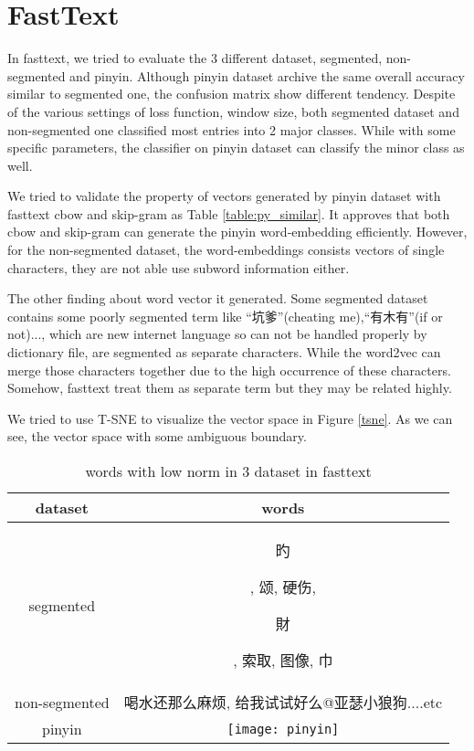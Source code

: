 \section{FastText}

In fasttext, we tried to evaluate the 3 different dataset, segmented, non-segmented and pinyin. 
Although pinyin dataset archive the same overall accuracy similar to segmented one, the confusion matrix show different tendency.
Despite of the various settings of loss function, window size, both segmented dataset and non-segmented one classified most entries into 2 major classes.
While with some specific parameters, the classifier on pinyin dataset can classify the minor class as well. 

We tried to validate the property of vectors generated by pinyin dataset with fasttext cbow and skip-gram as Table \ref{table:py_similar}. 
It approves that both cbow and skip-gram can generate the pinyin word-embedding efficiently. 
However, for the non-segmented dataset, the word-embeddings consists vectors of single characters, they are not able use subword information either.

The other finding about word vector it generated. 
Some segmented dataset contains some poorly segmented term like \enquote{坑爹}(cheating me),\enquote{有木有}(if or not)..., which are new internet language so can not be handled properly by dictionary file, are segmented as separate characters.  
While the word2vec can merge those characters together due to the high occurrence of these characters. 
Somehow, fasttext treat them as separate term but they may be related highly.

We tried to use T-SNE to visualize the vector space in Figure \ref{tsne}. As we can see, the vector space with some ambiguous boundary.


\begin{CJK}{UTF8}{gbsn}
\begin{table}[]
\centering
\caption{words with low norm in 3 dataset in fasttext}
\label{table:lownorm}
\begin{tabular}{|c|c|}
\hline
 dataset  & words  \\
\hline
segmented  & \begin{CJK}{UTF8}{bkai} 旳\end{CJK}, 颂, 硬伤, \begin{CJK}{UTF8}{bkai}財\end{CJK}, 索取, 图像, 巾 \\
non-segmented  & 喝水还那么麻烦, 给我试试好么@亚瑟小狼狗....etc   \\
pinyin     &         \texttt{[image: pinyin]} \\   
\hline
\end{tabular}
\end{table}
\end{CJK}

